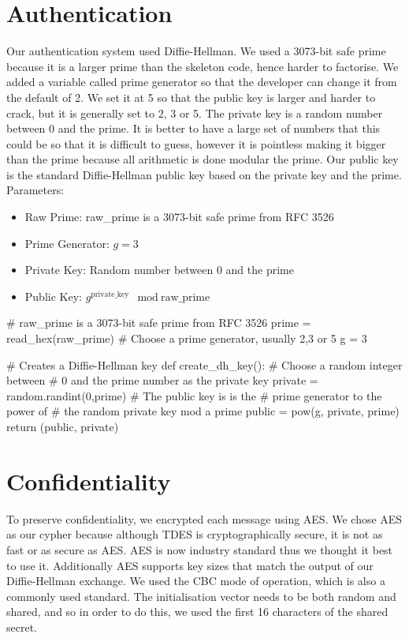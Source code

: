 \documentclass[9pt,a4paper]{article}
\begin{document}
\maketitle
\small

\section{Authentication}
Our authentication system used Diffie-Hellman. We used a 3073-bit safe prime because it is a larger prime than the skeleton code, hence harder to factorise. We added a variable called prime generator so that the developer can change it from the default of 2. We set it at 5 so that the public key is larger and harder to crack, but it is generally set to 2, 3 or 5. The private key is a random number between 0 and the prime. It is better to have a large set of numbers that this could be so that it is difficult to guess, however it is pointless making it bigger than the prime because all arithmetic is done modular the prime. Our public key is the standard Diffie-Hellman public key based on the private key and the prime.\\

Parameters:
\begin{itemize}
\item Raw Prime: raw\_prime is a 3073-bit safe prime from RFC 3526
\item Prime Generator: $g = 3$
\item Private Key: Random number between 0 and the prime
\item Public Key: $g^{\text{private\_key}} \mod \text{raw\_prime}$
\end{itemize}

\begin{center}
\begin{python}
# raw_prime is a 3073-bit safe prime from RFC 3526
prime = read_hex(raw_prime)
# Choose a prime generator, usually 2,3 or 5
g = 3

# Creates a Diffie-Hellman key
def create_dh_key():
    # Choose a random integer between 
    # 0 and the prime number as the private key
    private = random.randint(0,prime)
    # The public key is is the
    # prime generator to the power of 
    # the random private key mod a prime
    public  = pow(g, private, prime)
    return (public, private)
\end{python}
\end{center}

\section{Confidentiality}
To preserve confidentiality, we encrypted each message using AES. We chose AES as our cypher because although TDES is cryptographically secure, it is not as fast or as secure as AES. AES is now industry standard thus we thought it best to use it. Additionally AES supports key sizes that match the output of our Diffie-Hellman exchange. We used the CBC mode of operation, which is also a commonly used standard. The initialisation vector needs to be both random and shared, and so in order to do this, we used the first 16 characters of the shared secret.
\end{document}
